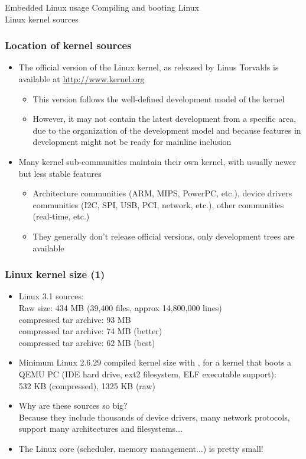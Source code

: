 \subchapterframe
{Embedded Linux usage}
{Compiling and booting Linux\\
\normalsize Linux kernel sources}

\begin{frame}
  \frametitle{Location of kernel sources}
  \begin{itemize}
  \item The official version of the Linux kernel, as released by Linus
    Torvalds is available at \url{http://www.kernel.org}
    \begin{itemize}
    \item This version follows the well-defined development model of
      the kernel
    \item However, it may not contain the latest development from a
      specific area, due to the organization of the development model
      and because features in development might not be ready for
      mainline inclusion
    \end{itemize}
  \item Many kernel sub-communities maintain their own kernel, with
    usually newer but less stable features
    \begin{itemize}
    \item Architecture communities (ARM, MIPS, PowerPC, etc.), device
      drivers communities (I2C, SPI, USB, PCI, network, etc.), other
      communities (real-time, etc.)
    \item They generally don't release official versions, only
      development trees are available
    \end{itemize}
  \end{itemize}
\end{frame}

\begin{frame}
  \frametitle{Linux kernel size (1)}
  \begin{itemize}
  \item Linux 3.1 sources:\\
    Raw size: 434 MB (39,400 files, approx 14,800,000 lines)\\
     compressed tar archive: 93 MB\\
     compressed tar archive: 74 MB (better)\\
     compressed tar archive: 62 MB (best)
  \item Minimum Linux 2.6.29 compiled kernel size with
    , for a kernel that boots a QEMU PC (IDE
    hard drive, ext2 filesystem, ELF executable support):\\
    532 KB (compressed), 1325 KB (raw)
  \item Why are these sources so big?\\
    Because they include thousands of device drivers, many network
    protocols, support many architectures and filesystems...
  \item The Linux core (scheduler, memory management...) is pretty
    small!
  \end{itemize}
\end{frame}


